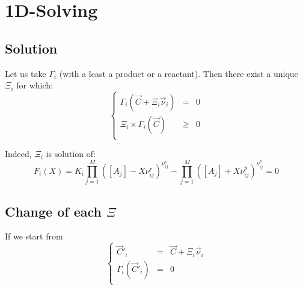 \documentclass[aps,12pt]{revtex4}
\begin{document}
\section{1D-Solving}

\subsection{Solution}

Let us take $\Gamma_i$ (with a least a product or a reactant).
Then there exist a unique $\Xi_i$ for which:
\begin{equation}
\left\lbrace
\begin{array}{rcl}
	\Gamma_i(\vec{C} + \Xi_i \vec{\nu}_i ) & = & 0\\
	 \Xi_i \times \Gamma_i(\vec{C}) &\geq  &0\\
\end{array}
\right.
\end{equation}
 
Indeed, $\Xi_i$ is solution of:
\begin{equation}
	 F_i(X) =  K_i \prod_{j=1}^{M} \left([A_j] - X \nu^r_{ij}\right)^{\nu^r_{ij}} 
	- \prod_{j=1}^{M} \left([A_j] + X \nu^p_{ij} \right)^{\nu^p_{ij}} = 0
\end{equation} 




\subsection{Change of each $\Xi$}
If we start from
\begin{equation}
\left\lbrace
\begin{array}{rcl}
	\vec{C}'_i & = & \vec{C} + \Xi_i \vec{\nu}_i\\
	\Gamma_i(\vec{C}'_i) & = & 0\\
\end{array}
\right.
\end{equation}
\end{document}
